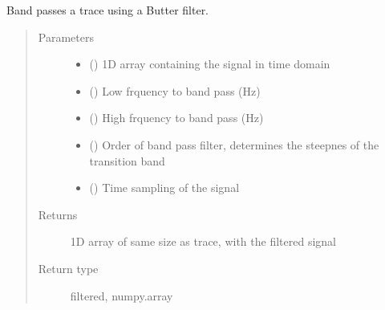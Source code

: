 \documentclass[letterpaper,10pt,english]{sphinxmanual}
\begin{document}

\begin{fulllineitems}
\label{\detokenize{index:fullwaveqc.tools.bandpass}}
Band passes a trace using a Butter filter.
\begin{quote}\begin{description}
\item[{Parameters}] \leavevmode\begin{itemize}
\item {} 
 () \textendash{} 1D array containing the signal in time domain

\item {} 
 () \textendash{} Low frquency to band pass (Hz)

\item {} 
 () \textendash{} High frquency to band pass (Hz)

\item {} 
 () \textendash{} Order of band pass filter, determines the steepnes of the transition band

\item {} 
 () \textendash{} Time sampling of the signal

\end{itemize}

\item[{Returns}] \leavevmode
1D array of same size as trace, with the filtered signal

\item[{Return type}] \leavevmode
filtered, numpy.array

\end{description}\end{quote}

\end{fulllineitems}
\end{document}
